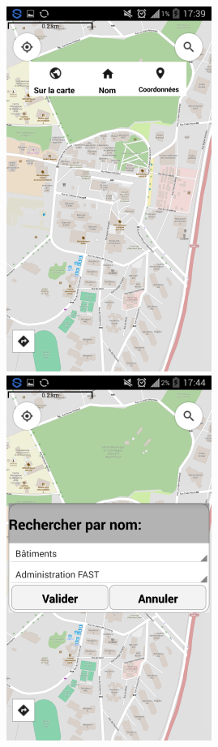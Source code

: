 \documentclass[11pt,handout]{beamer}
\begin{document}
		       \begin{frame}

			  \includegraphics[scale=0.42]{images/recherche.png}
			  \includegraphics[scale=0.42]{images/par_nom.png}

\end{frame}
\end{document}
